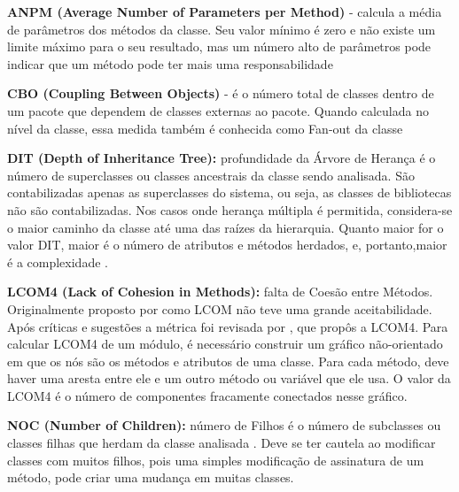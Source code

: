  \vspace{\onelineskip} 

 \textbf{ANPM (Average Number of Parameters per Method)} - calcula a média de parâmetros dos métodos da classe. Seu valor mínimo é zero e não existe um limite máximo para o seu resultado, mas um número alto de parâmetros pode indicar que um método pode ter mais uma responsabilidade \cite{Basili1987}


 \vspace{\onelineskip} 

\textbf{CBO (Coupling Between Objects)} -  é o número total de classes dentro de um pacote que dependem de classes externas ao pacote. Quando calculada no nível da classe, essa medida também é conhecida como Fan-out da classe \cite{Chidamber94}

 \vspace{\onelineskip} 

\textbf{DIT (Depth of Inheritance Tree):} profundidade da Árvore de Herança é o número
de superclasses ou classes ancestrais da classe sendo analisada. São contabilizadas
apenas as superclasses do sistema, ou seja, as classes de bibliotecas não são
contabilizadas. Nos casos onde herança múltipla é permitida, considera-se o maior
caminho da classe até uma das raízes da hierarquia. Quanto maior for o valor DIT,
maior é o número de atributos e métodos herdados, e, portanto,maior é a complexidade
\cite{Shih97}.

 \vspace{\onelineskip} 

\textbf{LCOM4 (Lack of Cohesion in Methods):} falta de Coesão entre Métodos. Originalmente
proposto por  como LCOM não teve uma
grande aceitabilidade. Após críticas e sugestões a métrica foi revisada por , que propôs a LCOM4. Para calcular LCOM4 de um módulo, é
necessário construir um gráfico não-orientado em que os nós são os métodos e atributos
de uma classe. Para cada método, deve haver uma aresta entre ele e um outro
método ou variável que ele usa. O valor da LCOM4 é o número de componentes
fracamente conectados nesse gráfico.


 \vspace{\onelineskip} 

\textbf{NOC (Number of Children):} número de Filhos é o número de subclasses ou classes
filhas que herdam da classe analisada \cite{Rosenberg97}. Deve se ter
cautela ao modificar classes com muitos filhos, pois uma simples modificação de
assinatura de um método, pode criar uma mudança em muitas classes.


